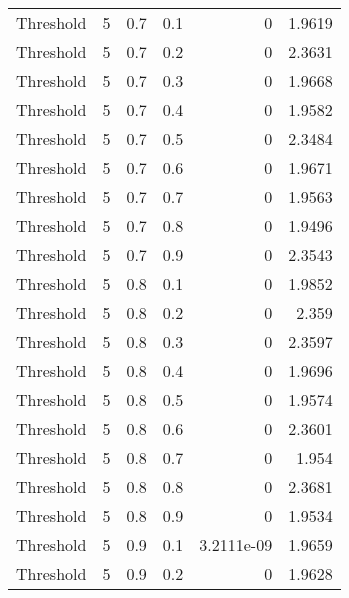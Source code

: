 \documentclass{article}
\begin{document}
\begin{longtable}[H]{lrrrrr}
 Threshold      &       5 &   0.7 &            0.1 &      0           &          1.9619 \\
 Threshold      &       5 &   0.7 &            0.2 &      0           &          2.3631 \\
 Threshold      &       5 &   0.7 &            0.3 &      0           &          1.9668 \\
 Threshold      &       5 &   0.7 &            0.4 &      0           &          1.9582 \\
 Threshold      &       5 &   0.7 &            0.5 &      0           &          2.3484 \\
 Threshold      &       5 &   0.7 &            0.6 &      0           &          1.9671 \\
 Threshold      &       5 &   0.7 &            0.7 &      0           &          1.9563 \\
 Threshold      &       5 &   0.7 &            0.8 &      0           &          1.9496 \\
 Threshold      &       5 &   0.7 &            0.9 &      0           &          2.3543 \\
 Threshold      &       5 &   0.8 &            0.1 &      0           &          1.9852 \\
 Threshold      &       5 &   0.8 &            0.2 &      0           &          2.359  \\
 Threshold      &       5 &   0.8 &            0.3 &      0           &          2.3597 \\
 Threshold      &       5 &   0.8 &            0.4 &      0           &          1.9696 \\
 Threshold      &       5 &   0.8 &            0.5 &      0           &          1.9574 \\
 Threshold      &       5 &   0.8 &            0.6 &      0           &          2.3601 \\
 Threshold      &       5 &   0.8 &            0.7 &      0           &          1.954  \\
 Threshold      &       5 &   0.8 &            0.8 &      0           &          2.3681 \\
 Threshold      &       5 &   0.8 &            0.9 &      0           &          1.9534 \\
 Threshold      &       5 &   0.9 &            0.1 &      3.2111e-09  &          1.9659 \\
 Threshold      &       5 &   0.9 &            0.2 &      0           &          1.9628 \\

\end{longtable}
\end{document}
